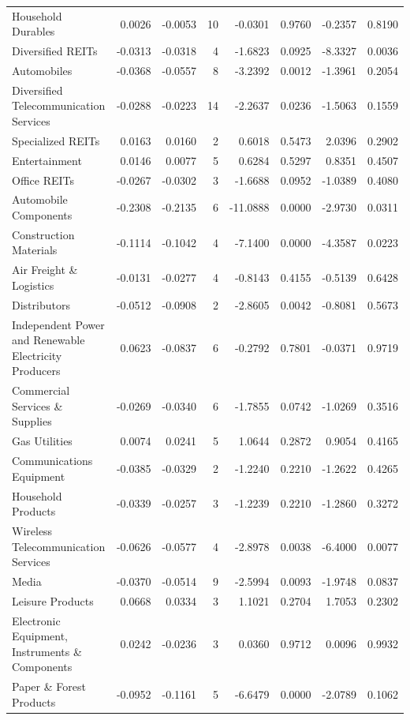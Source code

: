 \begin{table}
\begin{tabular}{lrrrrrrr}
Household Durables & 0.0026 & -0.0053 & 10 & -0.0301 & 0.9760 & -0.2357 & 0.8190 \\
Diversified REITs & -0.0313 & -0.0318 & 4 & -1.6823 & 0.0925 & -8.3327 & 0.0036 \\
Automobiles & -0.0368 & -0.0557 & 8 & -3.2392 & 0.0012 & -1.3961 & 0.2054 \\
Diversified Telecommunication Services & -0.0288 & -0.0223 & 14 & -2.2637 & 0.0236 & -1.5063 & 0.1559 \\
Specialized REITs & 0.0163 & 0.0160 & 2 & 0.6018 & 0.5473 & 2.0396 & 0.2902 \\
Entertainment & 0.0146 & 0.0077 & 5 & 0.6284 & 0.5297 & 0.8351 & 0.4507 \\
Office REITs & -0.0267 & -0.0302 & 3 & -1.6688 & 0.0952 & -1.0389 & 0.4080 \\
Automobile Components & -0.2308 & -0.2135 & 6 & -11.0888 & 0.0000 & -2.9730 & 0.0311 \\
Construction Materials & -0.1114 & -0.1042 & 4 & -7.1400 & 0.0000 & -4.3587 & 0.0223 \\
Air Freight \& Logistics & -0.0131 & -0.0277 & 4 & -0.8143 & 0.4155 & -0.5139 & 0.6428 \\
Distributors & -0.0512 & -0.0908 & 2 & -2.8605 & 0.0042 & -0.8081 & 0.5673 \\
Independent Power and Renewable Electricity Producers & 0.0623 & -0.0837 & 6 & -0.2792 & 0.7801 & -0.0371 & 0.9719 \\
Commercial Services \& Supplies & -0.0269 & -0.0340 & 6 & -1.7855 & 0.0742 & -1.0269 & 0.3516 \\
Gas Utilities & 0.0074 & 0.0241 & 5 & 1.0644 & 0.2872 & 0.9054 & 0.4165 \\
Communications Equipment & -0.0385 & -0.0329 & 2 & -1.2240 & 0.2210 & -1.2622 & 0.4265 \\
Household Products & -0.0339 & -0.0257 & 3 & -1.2239 & 0.2210 & -1.2860 & 0.3272 \\
Wireless Telecommunication Services & -0.0626 & -0.0577 & 4 & -2.8978 & 0.0038 & -6.4000 & 0.0077 \\
Media & -0.0370 & -0.0514 & 9 & -2.5994 & 0.0093 & -1.9748 & 0.0837 \\
Leisure Products & 0.0668 & 0.0334 & 3 & 1.1021 & 0.2704 & 1.7053 & 0.2302 \\
Electronic Equipment, Instruments \& Components & 0.0242 & -0.0236 & 3 & 0.0360 & 0.9712 & 0.0096 & 0.9932 \\
Paper \& Forest Products & -0.0952 & -0.1161 & 5 & -6.6479 & 0.0000 & -2.0789 & 0.1062 \\

\end{tabular}
\end{table}
